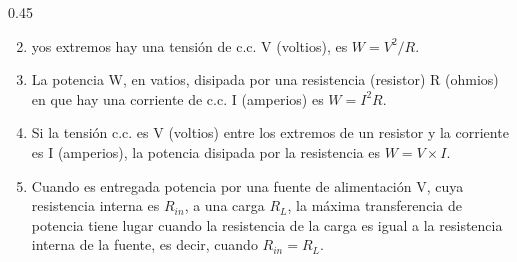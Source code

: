 \documentclass{article}
\begin{document}
\begin{parbox}[t]{0.45\textwidth}
{    \begin{enumerate}[1.]
        \setcounter{enumi}{1} %
        \item yos extremos hay una tensión de c.c. V (voltios), es $W = V^2/R$.
        \item La potencia W, en vatios, disipada por una resistencia (resistor) R (ohmios) en que hay una corriente de c.c. I (amperios) es $W = I^2R$.
        \item Si la tensión c.c. es V (voltios) entre los extremos de un resistor y la corriente es I (amperios), la potencia disipada por la resistencia es $W = V \times I$.
        \item Cuando es entregada potencia por una fuente de alimentación V, cuya resistencia interna es $R_{in}$, a una carga $R_L$, la máxima transferencia de potencia tiene lugar cuando la resistencia de la carga es igual a la resistencia interna de la fuente, es decir, cuando $R_{in} = R_L$.
    \end{enumerate}

}\end{parbox}
\hfill
\end{document}
